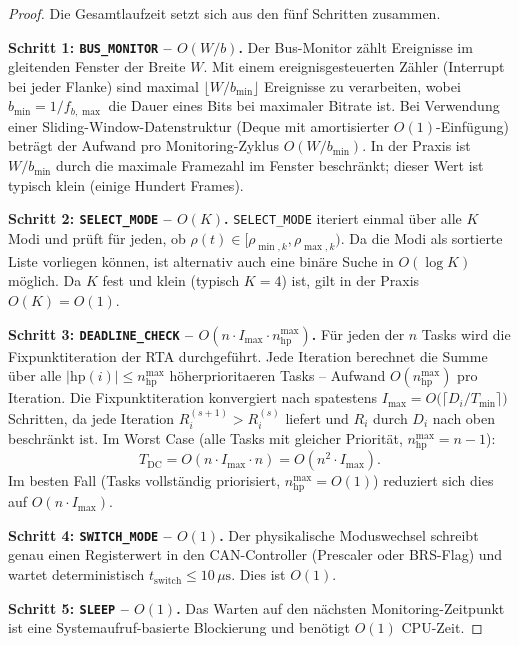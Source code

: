 ﻿\documentclass[a4paper,12pt]{article}
\theoremstyle{definition}
\begin{document}
\begin{proof}
Die Gesamtlaufzeit setzt sich aus den f\"{u}nf Schritten zusammen.

\textbf{Schritt 1: \texttt{BUS\_MONITOR} -- $O(W / b)$.}
Der Bus-Monitor z\"{a}hlt Ereignisse im gleitenden Fenster der Breite $W$.
Mit einem ereignisgesteuerten Z\"{a}hler (Interrupt bei jeder Flanke) sind maximal
$\lfloor W / b_{\min} \rfloor$ Ereignisse zu verarbeiten, wobei $b_{\min} = 1 / f_{b,\max}$
die Dauer eines Bits bei maximaler Bitrate ist.
Bei Verwendung einer Sliding-Window-Datenstruktur (Deque mit amortisierter
$O(1)$-Einf\"{u}gung) betr\"{a}gt der Aufwand pro Monitoring-Zyklus $O(W / b_{\min})$.
In der Praxis ist $W / b_{\min}$ durch die maximale Framezahl im Fenster beschr\"{a}nkt;
dieser Wert ist typisch klein (einige Hundert Frames).

\textbf{Schritt 2: \texttt{SELECT\_MODE} -- $O(K)$.}
\texttt{SELECT\_MODE} iteriert einmal \"{u}ber alle $K$ Modi und pr\"{u}ft f\"{u}r jeden,
ob $\rho(t) \in [\rho_{\min,k}, \rho_{\max,k})$.
Da die Modi als sortierte Liste vorliegen k\"{o}nnen, ist alternativ auch eine
bin\"{a}re Suche in $O(\log K)$ m\"{o}glich.
Da $K$ fest und klein (typisch $K = 4$) ist, gilt in der Praxis $O(K) = O(1)$.

\textbf{Schritt 3: \texttt{DEADLINE\_CHECK} -- $O(n \cdot I_{\max} \cdot n_{\mathrm{hp}}^{\max})$.}
F\"{u}r jeden der $n$ Tasks wird die Fixpunktiteration der RTA durchgef\"{u}hrt.
Jede Iteration berechnet die Summe \"{u}ber alle $|\mathrm{hp}(i)| \leq n_{\mathrm{hp}}^{\max}$
h\"{o}herprioritaeren Tasks -- Aufwand $O(n_{\mathrm{hp}}^{\max})$ pro Iteration.
Die Fixpunktiteration konvergiert nach spatestens
$I_{\max} = O\bigl(\lceil D_i / T_{\min} \rceil\bigr)$ Schritten, da jede Iteration
$R_i^{(s+1)} > R_i^{(s)}$ liefert und $R_i$ durch $D_i$ nach oben beschr\"{a}nkt ist.
Im Worst Case (alle Tasks mit gleicher Priorit\"{a}t, $n_{\mathrm{hp}}^{\max} = n - 1$):
\[
    T_{\text{DC}} = O(n \cdot I_{\max} \cdot n) = O(n^2 \cdot I_{\max}).
\]
Im besten Fall (Tasks vollst\"{a}ndig priorisiert, $n_{\mathrm{hp}}^{\max} = O(1)$)
reduziert sich dies auf $O(n \cdot I_{\max})$.

\textbf{Schritt 4: \texttt{SWITCH\_MODE} -- $O(1)$.}
Der physikalische Moduswechsel schreibt genau einen Registerwert in den
CAN-Controller (Prescaler oder BRS-Flag) und wartet deterministisch
$t_{\mathrm{switch}} \leq 10\,\mu\text{s}$.
Dies ist $O(1)$.

\textbf{Schritt 5: \texttt{SLEEP} -- $O(1)$.}
Das Warten auf den n\"{a}chsten Monitoring-Zeitpunkt ist eine Systemaufruf-basierte
Blockierung und ben\"{o}tigt $O(1)$ CPU-Zeit.


\end{proof}
\end{document}
